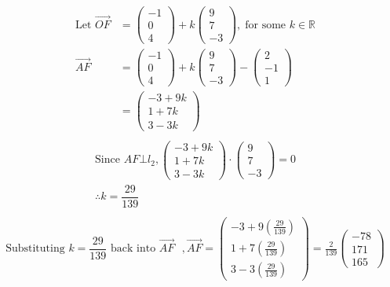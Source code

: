 \documentclass[12pt, a4 paper]{article}
\begin{document}
\begin{outline}[enumerate]
					\color{blue}
					\begin{align*}
						{\textrm{Let }}\overrightarrow {OF} & = \left( {\begin{array}{*{20}{c}}{ - 1} \\0\\4\end{array}} \right) + k\left( {\begin{array}{*{20}{c}}9\\7\\{ - 3}\end{array}} \right),\;{\textrm{for some }}k \in \mathbb{R}\\\overrightarrow {AF}  &= \left( {\begin{array}{*{20}{c}}{ - 1}\\0\\4\end{array}} \right) + k\left( {\begin{array}{*{20}{c}}9\\7\\{ - 3}\end{array}} \right) - \left( {\begin{array}{*{20}{c}}2\\{ - 1}\\1\end{array}} \right)\\ &= \left( {\begin{array}{*{20}{c}}{ - 3 + 9k}\\{1 + 7k}\\{3 - 3k}\end{array}} \right)\\
					\end{align*}
					\begin{align*}
						{\textrm{Since }}AF \bot {l_2},\left( {\begin{array}{*{20}{c}}{ - 3 + 9k} \\{1 + 7k}\\{3 - 3k}\end{array}} \right) \cdot \left( {\begin{array}{*{20}{c}}9\\7\\{ - 3}\end{array}} \right) = 0\\\therefore k = \dfrac{{29}}{{139}}\\
					\end{align*}
					\begin{align*}
						{\textrm{Substituting }}k = \dfrac{{29}}{{139}}{\textrm{ back into }}\overrightarrow {AF}{\textrm{ }},\overrightarrow {AF}  = \left( {\begin{array}{*{20}{c}}{ - 3 + 9\left( {\frac{{29}}{{139}}} \right)} \\{1 + 7\left( {\frac{{29}}{{139}}} \right)}\\{3 - 3\left( {\frac{{29}}{{139}}} \right)}\end{array}} \right) = \frac{2}{{139}}\left( {\begin{array}{*{20}{c}}{ - 78}\\{171}\\{165}\end{array}} \right)

\end{align*}
\end{outline}
\end{document}
